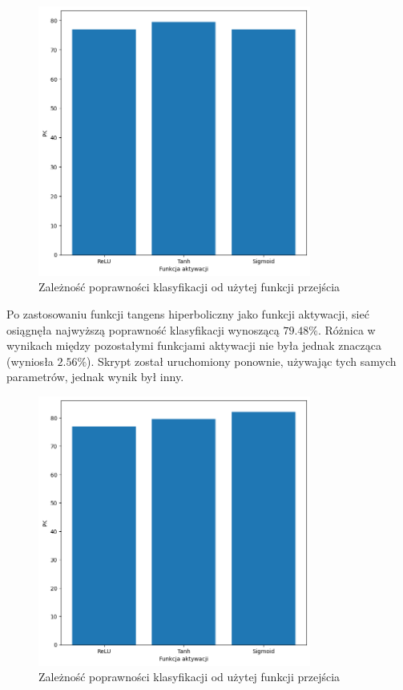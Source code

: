 \documentclass[a4paper]{article}
\begin{document}
\begin{figure}[H]
    \centering
    \includegraphics[width=0.8\textwidth, keepaspectratio]{pictures/ACTIVATION_1_1.png}
    \caption{Zależność poprawności klasyfikacji od użytej funkcji przejścia}
    \label{fig:activ_1}
\end{figure}

Po zastosowaniu funkcji tangens hiperboliczny jako funkcji aktywacji, sieć osiągnęła najwyższą poprawność klasyfikacji wynoszącą $79.48\%$.
Różnica w wynikach między pozostałymi funkcjami aktywacji nie była jednak znacząca (wyniosła $2.56\%$).
Skrypt został uruchomiony ponownie, używając tych samych parametrów, jednak wynik był inny.

\begin{figure}[H]
    \centering
    \includegraphics[width=0.8\textwidth, keepaspectratio]{pictures/ACTIVATION_1_2.png}
    \caption{Zależność poprawności klasyfikacji od użytej funkcji przejścia}
    \label{fig:activ_2}
\end{figure}
\end{document}
